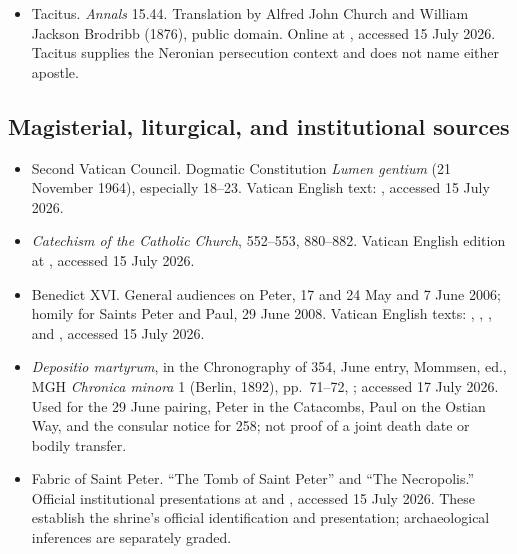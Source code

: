 \begin{itemize}
\item Tacitus. \emph{Annals} 15.44. Translation by Alfred John Church and
  William Jackson Brodribb (1876), public domain. Online at
  ,
  accessed 15 July 2026. Tacitus supplies the Neronian persecution context and
  does not name either apostle.
\end{itemize}

\subsection{Magisterial, liturgical, and institutional sources}

\begin{itemize}
\item Second Vatican Council. Dogmatic Constitution \emph{Lumen gentium}
  (21 November 1964), especially 18--23. Vatican English text:
  ,
  accessed 15 July 2026.

\item \emph{Catechism of the Catholic Church}, 552--553, 880--882. Vatican
  English edition at
  ,
  accessed 15 July 2026.

\item Benedict XVI\@. General audiences on Peter, 17 and 24 May and 7 June 2006;
  homily for Saints Peter and Paul, 29 June 2008. Vatican English texts:
  ,
  ,
  , and
  ,
  accessed 15 July 2026.

\item \emph{Depositio martyrum}, in the Chronography of 354, June entry,
Mommsen, ed., MGH \emph{Chronica minora} 1 (Berlin, 1892), pp.~71--72,
; accessed 17 July 2026. Used for the 29 June pairing,
Peter in the Catacombs, Paul on the Ostian Way, and the consular notice for
258; not proof of a joint death date or bodily transfer.

\item Fabric of Saint Peter. ``The Tomb of Saint Peter'' and ``The
  Necropolis.'' Official institutional presentations at
   and
  ,
  accessed 15 July 2026. These establish the shrine's official identification
  and presentation; archaeological inferences are separately graded.
\end{itemize}

